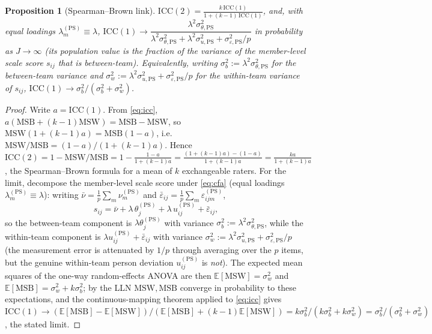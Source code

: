 \documentclass{amsart}
\newtheorem{proposition}{Proposition}
\theoremstyle{remark}
\begin{document}
\begin{proposition}[Spearman--Brown link]\label{prop:sb}
$\displaystyle \mathrm{ICC}(2)=\frac{k\,\mathrm{ICC}(1)}{1+(k-1)\,\mathrm{ICC}(1)}$,
and, with equal loadings $\lambda^{(\mathrm{PS})}_m\equiv\lambda$,
$\mathrm{ICC}(1)\to\dfrac{\lambda^2\sigma^2_{\theta,\mathrm{PS}}}
{\lambda^2\sigma^2_{\theta,\mathrm{PS}}+\lambda^2\sigma^2_{u,\mathrm{PS}}
+\sigma^2_{\varepsilon,\mathrm{PS}}/p}$ in probability as
$J\to\infty$ (its population value is the fraction of the variance of the
member-level scale score $s_{ij}$ that is between-team). Equivalently, writing
$\sigma^2_b:=\lambda^2\sigma^2_{\theta,\mathrm{PS}}$ for the between-team variance
and $\sigma^2_w:=\lambda^2\sigma^2_{u,\mathrm{PS}}+\sigma^2_{\varepsilon,\mathrm{PS}}/p$
for the within-team variance of $s_{ij}$, $\mathrm{ICC}(1)\to\sigma^2_b/(\sigma^2_b+\sigma^2_w)$.
\end{proposition}
\begin{proof}
Write $a=\mathrm{ICC}(1)$. From \eqref{eq:icc}, $a(\mathrm{MSB}+(k-1)\mathrm{MSW})=\mathrm{MSB}-\mathrm{MSW}$,
so $\mathrm{MSW}(1+(k-1)a)=\mathrm{MSB}(1-a)$, i.e.\
$\mathrm{MSW}/\mathrm{MSB}=(1-a)/(1+(k-1)a)$. Hence
$\mathrm{ICC}(2)=1-\mathrm{MSW}/\mathrm{MSB}=1-\frac{1-a}{1+(k-1)a}
=\frac{(1+(k-1)a)-(1-a)}{1+(k-1)a}=\frac{ka}{1+(k-1)a}$,
the Spearman--Brown formula for a mean of $k$ exchangeable raters. For the limit,
decompose the member-level scale score under \eqref{eq:cfa} (equal loadings
$\lambda^{(\mathrm{PS})}_m\equiv\lambda$): writing $\bar\nu=\frac1p\sum_m\nu^{(\mathrm{PS})}_m$
and $\bar\varepsilon_{ij}=\frac1p\sum_m\varepsilon^{(\mathrm{PS})}_{ijm}$,
\[
s_{ij}=\bar\nu+\lambda\,\theta^{(\mathrm{PS})}_j+\lambda\,u^{(\mathrm{PS})}_{ij}+\bar\varepsilon_{ij},
\]
so the between-team component is $\lambda\theta^{(\mathrm{PS})}_j$ with variance
$\sigma^2_b:=\lambda^2\sigma^2_{\theta,\mathrm{PS}}$, while the within-team
component is $\lambda u^{(\mathrm{PS})}_{ij}+\bar\varepsilon_{ij}$ with variance
$\sigma^2_w:=\lambda^2\sigma^2_{u,\mathrm{PS}}+\sigma^2_{\varepsilon,\mathrm{PS}}/p$
(the measurement error is attenuated by $1/p$ through averaging over the $p$ items,
but the genuine within-team person deviation $u^{(\mathrm{PS})}_{ij}$ is
\emph{not}). The expected mean squares of the one-way random-effects ANOVA are then
$\mathbb{E}[\mathrm{MSW}]=\sigma^2_w$ and
$\mathbb{E}[\mathrm{MSB}]=\sigma^2_w+k\sigma^2_b$; by the LLN
$\mathrm{MSW},\mathrm{MSB}$ converge in probability to these expectations, and the
continuous-mapping theorem applied to \eqref{eq:icc} gives
$\mathrm{ICC}(1)\to(\mathbb{E}[\mathrm{MSB}]-\mathbb{E}[\mathrm{MSW}])/
(\mathbb{E}[\mathrm{MSB}]+(k-1)\mathbb{E}[\mathrm{MSW}])
=k\sigma^2_b/(k\sigma^2_b+k\sigma^2_w)=\sigma^2_b/(\sigma^2_b+\sigma^2_w)$, the
stated limit. \end{proof}
\end{document}
